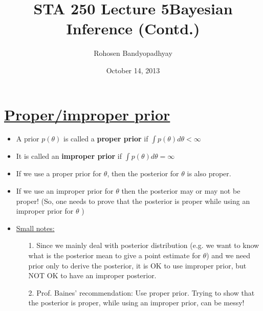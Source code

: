 \documentclass[12pt]{article}
\begin{document}
\title{\bf STA 250 Lecture 5}
\title{\bf  Bayesian Inference (Contd.)}
\author{Rohosen Bandyopadhyay}
\date{October 14, 2013}
\maketitle

\section{\underline{Proper/improper prior}}
\begin{itemize}
\item A prior $p(\theta)$ is called a \textbf{proper prior} if $\int p(\theta) d\theta < \infty$
\item It is called an \textbf{improper prior} if $\int p(\theta) d\theta = \infty$
\item If we use a proper prior for $\theta$, then the posterior for $\theta$ is also proper.
\item If we use an improper prior for $\theta$ then the posterior may or may not be proper! (So, one needs to prove that the posterior is proper while using an improper prior for $\theta$ )
\item \underline{Small notes:} 
\begin{enumerate}
\item[1.] Since we mainly deal with posterior distribution (e.g. we want to know what is the posterior mean to give a point estimate for $\theta$) and we need prior only to derive the posterior, it is OK to use improper prior, but NOT OK to have an improper posterior.
\item[2.] Prof. Baines' recommendation: Use proper prior. Trying to show that the posterior is proper, while using an improper prior, can be messy!
\end{enumerate}
\end{itemize}
\end{document}
